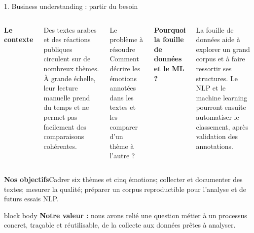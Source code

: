 \documentclass[aspectratio=169,10pt]{beamer}
\begin{document}
\begin{frame}{1. Business understanding : partir du besoin}
\begin{columns}[T,onlytextwidth]
\textbf{Le contexte}\par
Des textes arabes et des réactions publiques circulent sur de nombreux thèmes. À grande échelle, leur lecture manuelle prend du temps et ne permet pas facilement des comparaisons cohérentes.
\vspace{.22cm}
\begin{block}{Le problème à résoudre}
Comment décrire les émotions annotées dans les textes et les comparer d'un thème à l'autre ?
\end{block}
\textbf{Pourquoi la fouille de données et le ML ?}\par
La fouille de données aide à explorer un grand corpus et à faire ressortir ses structures. Le NLP et le machine learning pourront ensuite automatiser le classement, après validation des annotations.
\end{columns}
\vspace{.12cm}
\textbf{Nos objectifs}\quad Cadrer six thèmes et cinq émotions; collecter et documenter des textes; mesurer la qualité; préparer un corpus reproductible pour l'analyse et de futurs essais NLP.
\vspace{.12cm}
\begin{beamercolorbox}[wd=\linewidth,sep=.13cm,center,rounded=true]{block body}
\textbf{Notre valeur :} nous avons relié une question métier à un processus concret, traçable et réutilisable, de la collecte aux données prêtes à analyser.
\end{beamercolorbox}
\end{frame}
\end{document}
